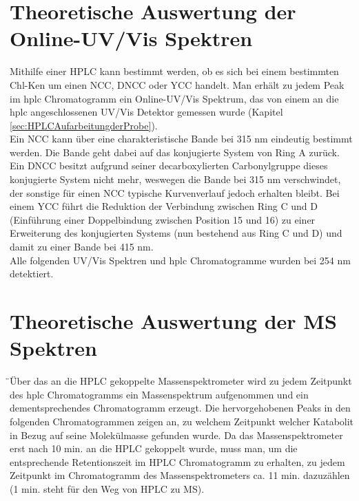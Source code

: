\section{Theoretische Auswertung der Online-UV/Vis Spektren} \label{sec:IdentifikationUVVis}

Mithilfe einer HPLC kann bestimmt werden, ob es sich bei einem bestimmten \gls{Chl-K}en um einen \gls{NCC}, \gls{DNCC} oder \gls{YCC} handelt. Man erhält zu jedem Peak im \gls{hplc} Chromatogramm ein Online-UV/Vis Spektrum, das von einem an die \gls{hplc} angeschlossenen UV/Vis Detektor gemessen wurde (Kapitel \ref{sec:HPLCAufarbeitungderProbe}). \\

Ein \gls{NCC} kann über eine charakteristische Bande bei 315 nm eindeutig bestimmt werden. Die Bande geht dabei auf das konjugierte System von Ring A zurück. Ein \gls{DNCC} besitzt aufgrund seiner decarboxylierten Carbonylgruppe dieses konjugierte System nicht mehr, weswegen die Bande bei 315 nm verschwindet, der sonstige für einen \gls{NCC} typische Kurvenverlauf jedoch erhalten bleibt. Bei einem \gls{YCC} führt die Reduktion der Verbindung zwischen Ring C und D (Einführung einer Doppelbindung zwischen Position 15 und 16) zu einer Erweiterung des konjugierten Systems (nun bestehend aus Ring C und D) und damit zu einer Bande bei 415 nm. \\

Alle folgenden UV/Vis Spektren und \gls{hplc} Chromatogramme wurden bei 254 nm detektiert.

\section{Theoretische Auswertung der MS Spektren} \label{sec:IdentifikationMS}

̈Über das an die HPLC gekoppelte Massenspektrometer wird zu jedem Zeitpunkt des \gls{hplc} Chromatogramms ein Massenspektrum aufgenommen und ein dementsprechendes Chromatogramm erzeugt. Die hervorgehobenen Peaks in den folgenden Chromatogrammen zeigen an, zu welchem Zeitpunkt welcher Katabolit in Bezug auf seine Molekülmasse gefunden wurde. Da das Massenspektrometer erst nach 10 min. an die HPLC gekoppelt wurde, muss man, um die entsprechende Retentionszeit im HPLC Chromatogramm zu erhalten, zu jedem Zeitpunkt im Chromatogramm des Massenspektrometers ca. 11 min. dazuzählen (1 min. steht für den Weg von HPLC zu MS).  \\

